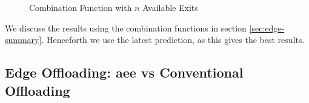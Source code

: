 \begin{figure}
	\hfill
	\caption[Combination Function with $ n $ Available Exits]{Combination Function with $ n $ Available Exits}
	\label{fig:theoretical-info-combi}
\end{figure}

We discuss the results using the combination functions in section \ref{sec:edge-summary}. Henceforth we use the latest prediction, as this gives the best results.  

\subsection{Edge Offloading: \gls{aee} vs Conventional Offloading}

